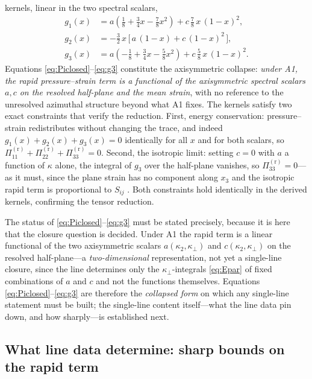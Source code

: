 \documentclass[lineno]{JFM-FLM_Au}
\begin{document}
kernels, linear in the two spectral scalars,
\begin{align}
  g_{1}(x) &= a\!\left(\tfrac18 + \tfrac34 x - \tfrac78 x^2\right)
            + c\,\tfrac78\,x\,(1-x)^2, \label{eq:g1}\\[2pt]
  g_{2}(x) &= -\tfrac32\,x\,\bigl[\,a\,(1-x) + c\,(1-x)^2\,\bigr],
            \label{eq:g2}\\[2pt]
  g_{3}(x) &= a\!\left(-\tfrac18 + \tfrac34 x - \tfrac58 x^2\right)
            + c\,\tfrac58\,x\,(1-x)^2. \label{eq:g3}
\end{align}
Equations \eqref{eq:Piclosed}--\eqref{eq:g3} constitute the axisymmetric collapse:
\emph{under A1, the rapid pressure--strain term is a
functional of the axisymmetric spectral scalars $a,c$ on the resolved
half-plane and the mean strain}, with no reference to the unresolved azimuthal
structure beyond what A1 fixes. The kernels satisfy two exact constraints that
verify the reduction. First, energy conservation: pressure--strain
redistributes without changing the trace, and indeed
$g_1(x)+g_2(x)+g_3(x)=0$ identically for all $x$ and for both scalars, so
$\Pi^{(\mathrm r)}_{11}+\Pi^{(\mathrm r)}_{22}+\Pi^{(\mathrm r)}_{33}=0$.
Second, the isotropic limit: setting $c=0$ with $a$ a function of $\kappa$
alone, the integral of $g_3$ over the half-plane vanishes, so
$\Pi^{(\mathrm r)}_{33}=0$---as it must, since the plane strain has no
component along $x_3$ and the isotropic rapid term is proportional to $S_{ij}$
\citep{Crow1968}. Both constraints hold identically in the derived kernels,
confirming the tensor reduction.

The status of \eqref{eq:Piclosed}--\eqref{eq:g3} must be stated precisely,
because it is here that the closure question is decided. Under A1 the rapid
term is a linear functional of the two axisymmetric scalars
$a(\kappa_2,\kappa_\perp)$ and $c(\kappa_2,\kappa_\perp)$ on the resolved
half-plane---a \emph{two-dimensional} representation, not yet a single-line
closure, since the line determines only the $\kappa_\perp$-integrals
\eqref{eq:Epar} of fixed combinations of $a$ and $c$ and not the functions
themselves. Equations \eqref{eq:Piclosed}--\eqref{eq:g3} are therefore the
\emph{collapsed form} on which any single-line statement must be built; the
single-line content itself---what the line data pin down, and how
sharply---is established next.

\subsection{What line data determine: sharp bounds on the rapid term}
\label{sec:bounds}
\end{document}
